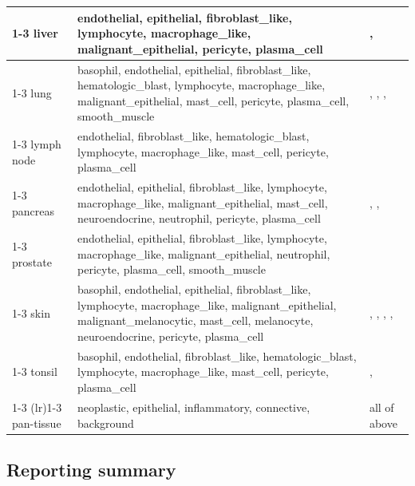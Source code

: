 \documentclass[sn-mathphys-num]{sn-jnl}%
\theoremstyle{thmstyleone}%
\theoremstyle{thmstyletwo}%
\theoremstyle{thmstylethree}%
\begin{document}
\begin{table}[t]
\begin{tabularx}{\linewidth}{p{9em} >{\raggedright\arraybackslash}X p{2.5cm}}
			\cmidrule(lr){1-3}
			liver & endothelial, epithelial, fibroblast\_like, lymphocyte, macrophage\_like, malignant\_epithelial, pericyte, plasma\_cell & \datasetref{liver-cancer}, \datasetref{liver-normal} \\
			\cmidrule(lr){1-3}
			lung & basophil, endothelial, epithelial, fibroblast\_like, hematologic\_blast, lymphocyte, macrophage\_like, malignant\_epithelial, mast\_cell, pericyte, plasma\_cell, smooth\_muscle & \datasetref{lung-prime-exp2}, \datasetref{lung-io}, \datasetref{lung-v1-exp1}, \datasetref{lung-seg} \\
			\cmidrule(lr){1-3}
			lymph node & endothelial, fibroblast\_like, hematologic\_blast, lymphocyte, macrophage\_like, mast\_cell, pericyte, plasma\_cell & \datasetref{lymph-node-pan5k} \\
			\cmidrule(lr){1-3}
			pancreas & endothelial, epithelial, fibroblast\_like, lymphocyte, macrophage\_like, malignant\_epithelial, mast\_cell, neuroendocrine, neutrophil, pericyte, plasma\_cell & \datasetref{pancreas-cancer}, \datasetref{pancreas-pdac-io}, \datasetref{pancreas-seg} \\
			\cmidrule(lr){1-3}
			prostate & endothelial, epithelial, fibroblast\_like, lymphocyte, macrophage\_like, malignant\_epithelial, neutrophil, pericyte, plasma\_cell, smooth\_muscle & \datasetref{prostate-preview} \\
			\cmidrule(lr){1-3}
			skin & basophil, endothelial, epithelial, fibroblast\_like, lymphocyte, macrophage\_like, malignant\_epithelial, malignant\_melanocytic, mast\_cell, melanocyte, neuroendocrine, pericyte, plasma\_cell & \datasetref{skin-melanoma}, \datasetref{skin-preview}, \datasetref{skin-mt-1}, \datasetref{skin-mt-2}, \datasetref{skin-preview-addon} \\
			\cmidrule(lr){1-3}
			tonsil & basophil, endothelial, fibroblast\_like, hematologic\_blast, lymphocyte, macrophage\_like, mast\_cell, pericyte, plasma\_cell & \datasetref{tonsil-follicular}, \datasetref{tonsil-reactive} \\
			\cmidrule(lr){1-3}
			\morecmidrules
			\cmidrule(lr){1-3}
			pan-tissue & neoplastic, epithelial, inflammatory, connective, background
			& all of above \\
			\bottomrule%
		\end{tabularx}%
	\end{table}%
	
	\subsection{Reporting summary}
	
\end{document}
